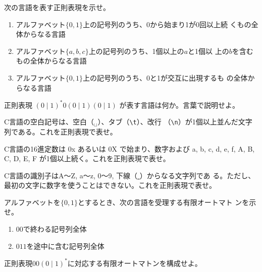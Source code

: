 \begin{exercise}
 \label{ex:regexp_01}
 次の言語を表す正則表現を示せ。
 \begin{enumerate}
  \item アルファベット$\{0, 1\}$上の記号列のうち、0から始まり1が0回以上続
	くもの全体からなる言語
  \item アルファベット$\{a, b, c\}$上の記号列のうち、1個以上の$a$と1個以
	上の$b$を含むもの全体からなる言語
  \item アルファベット$\{0, 1\}$上の記号列のうち、0と1が交互に出現するも
	の全体からなる言語
 \end{enumerate}
\end{exercise}
\begin{exercise}
 \label{ex:regexp_02}
 正則表現 $(0 \mid 1)^\ast 0(0\mid 1)(0\mid 1)$ が表す言語は何か。言葉で説明せよ。
\end{exercise}
\begin{exercise}
 \label{ex:regexp_03}
 C言語の空白記号は、空白（$_{\sqcup}$）、タブ（\verb|\t|）、改行
 （\verb|\n|）が1個以上並んだ文字列である。これを正則表現で表せ。
\end{exercise}
\begin{exercise}
 \label{ex:regexp_04}
 C言語の16進定数は 0x あるいは 0X で始まり、数字および a, b, c, d, e, f,
 A, B, C, D, E, F が1個以上続く。これを正則表現で表せ。
\end{exercise}
\begin{exercise}
 \label{ex:regexp_05}
 C言語の識別子はA〜Z, a〜z, 0〜9, 下線（\underline{ }）からなる文字列であ
 る。ただし、最初の文字に数字を使うことはできない。これを正則表現で表せ。
\end{exercise}
\begin{exercise}
 \label{ex:regexp_06}
 アルファベットを$\{0, 1\}$とするとき、次の言語を受理する有限オートマト
 ンを示せ。
 \begin{enumerate}
  \item $00$で終わる記号列全体
  \item $011$を途中に含む記号列全体
 \end{enumerate}
\end{exercise}
\begin{exercise}
 \label{ex:regexp_07}
 正則表現$00(0 \mid 1)^\ast$に対応する有限オートマトンを構成せよ。
\end{exercise}
